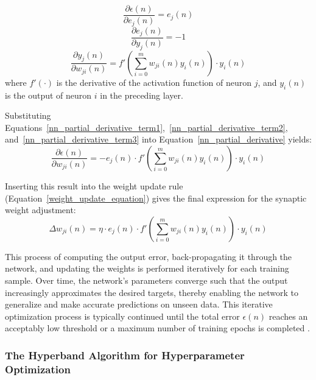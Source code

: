 \begin{equation} \label{nn_partial_derivative_term1}
	\frac{\partial \epsilon(n)}{\partial e_j(n)} = e_j(n)
\end{equation}
\begin{equation} \label{nn_partial_derivative_term2}
	\frac{\partial e_j(n)}{\partial y_j(n)} = -1
\end{equation}
\begin{equation} \label{nn_partial_derivative_term3}
	\frac{\partial y_j(n)}{\partial w_{ji}(n)} =
	f'\left(\sum_{i=0}^{m} w_{ji}(n) y_i(n)\right) \cdot y_i(n)
\end{equation}
where $f'(\cdot)$ is the derivative of the activation function of neuron $j$, and $y_i(n)$ is the output of neuron $i$ in the preceding layer.

Substituting Equations~\ref{nn_partial_derivative_term1},~\ref{nn_partial_derivative_term2}, and~\ref{nn_partial_derivative_term3} into Equation~\ref{nn_partial_derivative} yields:
\begin{equation}
	\frac{\partial \epsilon(n)}{\partial w_{ji}(n)} =
	-e_j(n) \cdot f'\left(\sum_{i=0}^{m} w_{ji}(n) y_i(n)\right) \cdot y_i(n)
\end{equation}

Inserting this result into the weight update rule (Equation~\ref{weight_update_equation}) gives the final expression for the synaptic weight adjustment:
\begin{equation}
	\Delta w_{ji}(n) = \eta \cdot e_j(n) \cdot f'\left(\sum_{i=0}^{m} w_{ji}(n) y_i(n)\right) \cdot y_i(n)
\end{equation}

This process of computing the output error, back-propagating it through the network, and updating the weights is performed iteratively for each training sample. Over time, the network's parameters converge such that the output increasingly approximates the desired targets, thereby enabling the network to generalize and make accurate predictions on unseen data. This iterative optimization process is typically continued until the total error $\epsilon(n)$ reaches an acceptably low threshold or a maximum number of training epochs is completed \parencite{sazli2006feedforwardnn}.

\subsubsection{The Hyperband Algorithm for Hyperparameter Optimization}
\label{subsec:hyperband_algorithm}

